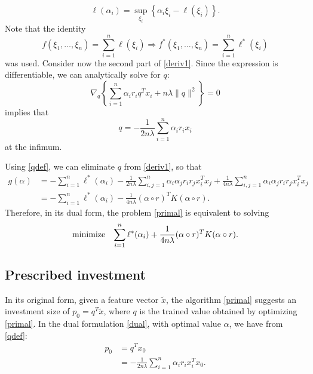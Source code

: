 \documentclass{article}
\newcommand{\sumi}{\sum_{i=1}^n}
\newcommand{\sumij}{\sum_{i,j=1}^n}
\begin{document}
\begin{equation}
  \ell(\alpha_i) = \sup_{\xi_i}\left\{\alpha_i\xi_i - \ell(\xi_i)\right\}.
\end{equation}
Note that the identity
\begin{equation}
  \label{lemma1}
  f(\xi_1,\dots,\xi_n) = \sumi \ell(\xi_i) \Longrightarrow f^*(\xi_1,\dots,\xi_n) = \sumi \ell^*(\xi_i)
\end{equation}
was used. Consider now the second part of \eqref{deriv1}. Since
the expression is differentiable, we can analytically solve for $q$:
\begin{equation}
  \nabla_q \left\{\sumi \alpha_ir_iq^Tx_i + n\lambda\|q\|^2\right\} = 0
\end{equation}
implies that
\begin{equation}
 q = -\frac{1}{2n\lambda}\sumi \alpha_ir_ix_i \label{qdef}
\end{equation}
at the infimum.

Using \eqref{qdef}, we can eliminate $q$ from \eqref{deriv1}, so that
\begin{align}
  g(\alpha) &= -\sumi \ell^*(\alpha_i) - \frac{1}{2n\lambda}\sumij \alpha_i\alpha_jr_ir_jx_i^Tx_j + \frac{1}{4n\lambda}
         \sumij \alpha_i\alpha_jr_ir_jx_i^Tx_j\\
       &= -\sumi \ell^*(\alpha_i) - \frac{1}{4n\lambda}(\alpha \circ r)^TK(\alpha \circ r). 
\end{align}
Therefore, in its dual form, the problem \eqref{primal} is equivalent to solving
\begin{equation}
  \label{dual}
  \minimizeEquation{\sumi \ell^*(\alpha_i) + \frac{1}{4n\lambda}(\alpha \circ r)^TK(\alpha \circ r).}
\end{equation}

\subsection{Prescribed investment}

In its original form, given a feature vector $\tilde x$, the algorithm \eqref{primal}
suggests an investment size of $p_0=q^T\tilde x$, where $q$ is the trained value obtained by
optimizing \eqref{primal}. In the dual formulation \eqref{dual}, with optimal value
$\alpha$, we have from \eqref{qdef}:
\begin{align}
  p_0 &= q^Tx_0\\
      &= - \frac{1}{2n\lambda}\sumi \alpha_ir_ix_i^Tx_0.
\end{align}
\end{document}
